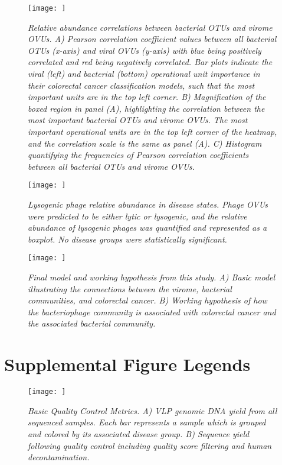 \documentclass[12pt,]{article}
\newcommand{\beginsupplement}{%
        \setcounter{table}{0}
        \renewcommand{\thetable}{S\arabic{table}}%
        \setcounter{figure}{0}
        \renewcommand{\thefigure}{S\arabic{figure}}%
     }
\begin{document}
\begin{figure}[htbp]
\centering
\texttt{[image: ]}
\caption{\emph{Relative abundance correlations between bacterial OTUs
and virome OVUs. A) Pearson correlation coefficient values between all
bacterial OTUs (x-axis) and viral OVUs (y-axis) with blue being
positively correlated and red being negatively correlated. Bar plots
indicate the viral (left) and bacterial (bottom) operational unit
importance in their colorectal cancer classification models, such that
the most important units are in the top left corner. B) Magnification of
the boxed region in panel (A), highlighting the correlation between the
most important bacterial OTUs and virome OVUs. The most important
operational units are in the top left corner of the heatmap, and the
correlation scale is the same as panel (A). C) Histogram quantifying the
frequencies of Pearson correlation coefficients between all bacterial
OTUs and virome OVUs.}\label{correlations}}
\end{figure}

\newpage

\begin{figure}[htbp]
\centering
\texttt{[image: ]}
\caption{\emph{Lysogenic phage relative abundance in disease states.
Phage OVUs were predicted to be either lytic or lysogenic, and the
relative abundance of lysogenic phages was quantified and represented as
a boxplot. No disease groups were statistically
significant.}\label{replicationstyles}}
\end{figure}

\newpage

\begin{figure}[htbp]
\centering
\texttt{[image: ]}
\caption{\emph{Final model and working hypothesis from this study. A)
Basic model illustrating the connections between the virome, bacterial
communities, and colorectal cancer. B) Working hypothesis of how the
bacteriophage community is associated with colorectal cancer and the
associated bacterial community.}\label{modelsummary}}
\end{figure}

\newpage

\section{Supplemental Figure Legends}\label{supplemental-figure-legends}

\beginsupplement

\begin{figure}[htbp]
\centering
\texttt{[image: ]}
\caption{\emph{Basic Quality Control Metrics. A) VLP genomic DNA yield
from all sequenced samples. Each bar represents a sample which is
grouped and colored by its associated disease group. B) Sequence yield
following quality control including quality score filtering and human
decontamination.}\label{qualcontrol}}
\end{figure}
\end{document}
